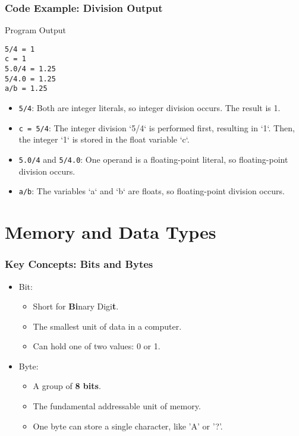 \documentclass{beamer}
\begin{document}
\begin{frame}[fragile]
\frametitle{Code Example: Division Output}
\begin{block}{Program Output}
\begin{verbatim}
5/4 = 1
c = 1
5.0/4 = 1.25
5/4.0 = 1.25
a/b = 1.25
\end{verbatim}
\end{block}

\begin{itemize}
    \item \texttt{5/4}: Both are integer literals, so integer division occurs. The result is 1.
    \item \texttt{c = 5/4}: The integer division `5/4` is performed first, resulting in `1`. Then, the integer `1` is stored in the float variable `c`.
    \item \texttt{5.0/4} and \texttt{5/4.0}: One operand is a floating-point literal, so floating-point division occurs.
    \item \texttt{a/b}: The variables `a` and `b` are floats, so floating-point division occurs.
\end{itemize}
\end{frame}

\section{Memory and Data Types}

\begin{frame}
\frametitle{Key Concepts: Bits and Bytes}
\begin{itemize}
    \item \alert{Bit}:
    \begin{itemize}
        \item Short for \textbf{Bi}nary Digi\textbf{t}.
        \item The smallest unit of data in a computer.
        \item Can hold one of two values: 0 or 1.
    \end{itemize}
    \bigskip
    \item \alert{Byte}:
    \begin{itemize}
        \item A group of \textbf{8 bits}.
        \item The fundamental addressable unit of memory.
        \item One byte can store a single character, like 'A' or '?'.
    \end{itemize}
\end{itemize}
\end{frame}
\end{document}
